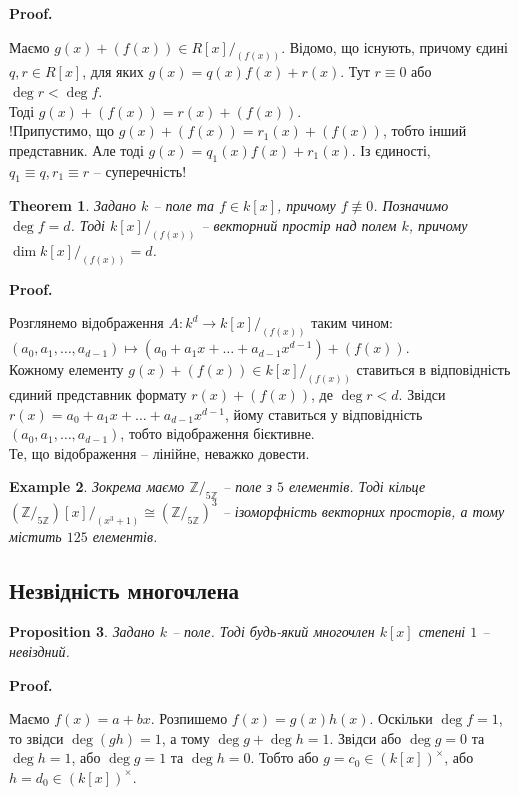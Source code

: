 \documentclass[a4paper, 10pt]{article}
\makeatletter
\theoremstyle{theoremdd}
\newtheorem{theorem}{Theorem}[subsection]
\theoremstyle{theoremdd}
\theoremstyle{theoremdd}
\theoremstyle{theoremdd}
\theoremstyle{theoremdd}
\newtheorem{example}[theorem]{Example}
\theoremstyle{theoremdd}
\theoremstyle{theoremdd}
\theoremstyle{theoremdd}
\theoremstyle{theoremdd}
\newtheorem{proposition}[theorem]{Proposition}
\theoremstyle{theoremdd}
\theoremstyle{theoremdd}
\theoremstyle{theoremdd}
\theoremstyle{theoremdd}
\theoremstyle{theoremdd}
\theoremstyle{theoremdd}
\renewenvironment{proof}[1][Proof.\\]{\par
\pushQED{\hfill \qed}%
\normalfont \topsep6\p@\@plus6\p@\relax
\trivlist
\item\relax
{\bfseries
#1\@addpunct{.}}\hspace\labelsep\ignorespaces
}{%
\popQED\endtrivlist\@endpefalse
}
\makeatother
\begin{document}
\begin{proof}
Маємо $g(x) + (f(x)) \in R[x]/_{(f(x))}$. Відомо, що існують, причому єдині $q,r \in R[x]$, для яких $g(x) = q(x)f(x) + r(x)$. Тут $r \equiv 0$ або $\deg r < \deg f$.\\
Тоді $g(x) + (f(x)) = r(x) + (f(x))$.\\
!Припустимо, що $g(x) + (f(x)) = r_1(x) + (f(x))$, тобто інший представник. Але тоді $g(x) = q_1(x) f(x) + r_1(x)$. Із єдиності, $q_1 \equiv q, r_1 \equiv r$ -- суперечність!
\end{proof}

\begin{theorem}
Задано $k$ -- поле та $f \in k[x]$, причому $f \not\equiv 0$. Позначимо $\deg f = d$. Тоді $k[x]/_{(f(x))}$ -- векторний простір над полем $k$, причому $\dim k[x]/_{(f(x))} = d$.
\end{theorem}

\begin{proof}
Розглянемо відображення $A \colon k^d \to k[x]/_{(f(x))}$ таким чином:\\
$(a_0,a_1,\dots,a_{d-1}) \mapsto (a_0 + a_1 x + \dots + a_{d-1} x^{d-1}) + (f(x))$.\\
Кожному елементу $g(x) + (f(x)) \in k[x]/_{(f(x))}$ ставиться в відповідність єдиний представник формату $r(x) + (f(x))$, де $\deg r < d$. Звідси $r(x) = a_0 + a_1 x + \dots + a_{d-1} x^{d-1}$, йому ставиться у відповідність $(a_0,a_1,\dots,a_{d-1})$, тобто відображення бієктивне.\\
Те, що відображення -- лінійне, неважко довести.
\end{proof}

\begin{example}
Зокрема маємо $\mathbb{Z}/_{5 \mathbb{Z}}$ -- поле з $5$ елементів. Тоді кільце \\
$(\mathbb{Z}/_{5 \mathbb{Z}})[x]/_{(x^3+1)} \cong (\mathbb{Z}/_{5 \mathbb{Z}})^3$ -- ізоморфність векторних просторів, а тому містить $125$ елементів.
\end{example}

\subsection{Незвідність многочлена}
\begin{proposition}
\label{deg_one_polynomial_at_field}
Задано $k$ -- поле. Тоді будь-який многочлен $k[x]$ степені $1$ -- невіздний.
\end{proposition}

\begin{proof}
Маємо $f(x) = a + bx$. Розпишемо $f(x) = g(x)h(x)$. Оскільки $\deg f = 1$, то звідси $\deg (gh) = 1$, а тому $\deg g + \deg h = 1$. Звідси або $\deg g = 0$ та $\deg h = 1$, або $\deg g = 1$ та $\deg h = 0$. Тобто або $g =c_0 \in (k[x])^\times$, або $h = d_0 \in (k[x])^\times$.
\end{proof}
\end{document}

